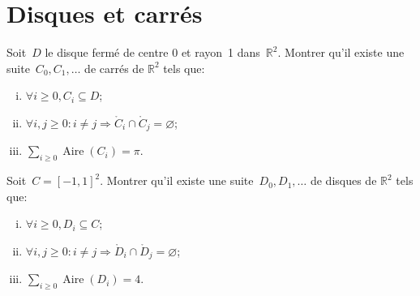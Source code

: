 \section{Disques et carrés}

Soit~$D$ le disque fermé de centre 0 et rayon~1 dans~$\mathbb{R}^2$. Montrer qu'il existe une suite~$C_0, C_1, \dotsc$ de carrés de $\mathbb{R}^2$
tels que:
\begin{enumerate}[(i)]
  \item $\forall i \geq0, C_i \subseteq D$;
  \item $\forall i, j \geq0: i\neq j \Rightarrow \mathring C_i \cap \mathring C_j = \varnothing$;
  \item $\sum_{i \geq 0} \operatorname{Aire}(C_i) = \pi$.
\end{enumerate}

Soit~$C = [-1,1]^2$.
Montrer qu'il existe une suite~$D_0, D_1, \dotsc$ de disques de $\mathbb{R}^2$
tels que:
\begin{enumerate}[(i)]
  \item $\forall i \geq0, D_i \subseteq C$;
  \item $\forall i, j \geq0: i\neq j \Rightarrow \mathring D_i \cap \mathring D_j = \varnothing$;
  \item $\sum_{i \geq 0} \operatorname{Aire}(D_i) = 4$.
\end{enumerate}


